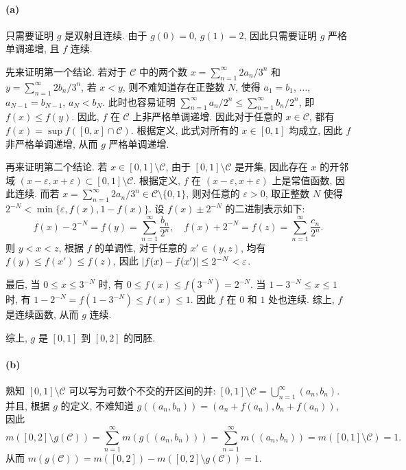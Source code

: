 \documentclass{article}
\begin{document}
\begin{solution}
	\paragraph{(a)} 只需要证明 $g$ 是双射且连续. 由于 $g(0) = 0$, $g(1) = 2$, 因此只需要证明 $g$ 严格单调递增, 且 $f$ 连续.

	先来证明第一个结论. 若对于 $\mathcal{C}$ 中的两个数 $x = \sum_{n=1}^{\infty}2a_n/3^n$ 和 $y = \sum_{n=1}^{\infty} 2b_n/3^n$, 若 $x<y$, 则不难知道存在正整数 $N$, 使得 $a_1 = b_1$, $\dots$, $a_{N-1} = b_{N-1}$, $a_N < b_N$. 此时也容易证明 $\sum_{n=1}^{\infty} a_n/2^n \le \sum_{n=1}^{\infty} b_n/2^n$, 即 $f(x) \le f(y)$. 因此, $f$ 在 $\mathcal{C}$ 上非严格单调递增. 因此对于任意的 $x \in \mathcal{C}$, 都有 $f(x) = \sup f([0, x] \cap \mathcal{C})$. 根据定义, 此式对所有的 $x \in [0,1]$ 均成立, 因此 $f$ 非严格单调递增, 从而 $g$ 严格单调递增.

	再来证明第二个结论. 若 $x \in [0,1] \setminus \mathcal{C}$, 由于 $[0,1] \setminus \mathcal{C}$ 是开集, 因此存在 $x$ 的开邻域 $(x-\varepsilon, x+\varepsilon) \subset [0,1] \setminus \mathcal{C}$. 根据定义, $f$ 在 $(x-\varepsilon, x+\varepsilon)$ 上是常值函数, 因此连续. 而若 $x = \sum_{n=1}^{\infty} 2a_n/3^n \in \mathcal{C} \setminus \{0,1\}$, 则对任意的 $\varepsilon>0$, 取正整数 $N$ 使得 $2^{-N} < \min\{\varepsilon, f(x), 1-f(x)\}$. 设 $f(x) \pm 2^{-N}$ 的二进制表示如下:
	\[ f(x) - 2^{-N} = f(y) = \sum_{n = 1}^{\infty} \frac{b_n}{2^n}, \quad
	f(x) + 2^{-N} = f(z) = \sum_{n = 1}^{\infty} \frac{c_n}{2^n}. \]
	则 $y<x<z$, 根据 $f$ 的单调性, 对于任意的 $x' \in (y, z)$, 均有 $f(y) \le f(x') \le f(z)$, 因此 $\left|f(x) - f(x')\right| \le 2^{-N} < \varepsilon$.

	最后, 当 $0 \le x \le 3^{-N}$ 时, 有 $0 \le f(x) \le f(3^{-N}) = 2^{-N}$. 当 $1-3^{-N} \le x \le 1$ 时, 有 $1-2^{-N} = f(1-3^{-N}) \le f(x) \le 1$. 因此 $f$ 在 $0$ 和 $1$ 处也连续. 综上, $f$ 是连续函数, 从而 $g$ 连续.

	综上, $g$ 是 $[0,1]$ 到 $[0,2]$ 的同胚.

	\paragraph{(b)} 熟知 $[0,1] \setminus \mathcal{C}$ 可以写为可数个不交的开区间的并: $[0,1] \setminus \mathcal{C} = \bigcup_{n=1}^{\infty}(a_n, b_n)$. 并且, 根据 $g$ 的定义, 不难知道 $g((a_n, b_n)) = (a_n + f(a_n), b_n + f(a_n))$, 因此
	\[ m([0,2] \setminus g(\mathcal{C})) = \sum_{n=1}^{\infty} m(g((a_n, b_n))) = \sum_{n=1}^{\infty}m((a_n, b_n)) = m([0,1] \setminus \mathcal{C}) = 1. \]
	从而 $m(g(\mathcal{C})) = m([0,2]) - m([0,2] \setminus g(\mathcal{C})) = 1$.


\end{solution}
\end{document}
